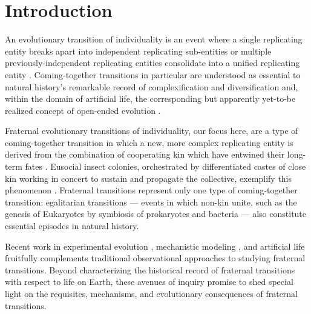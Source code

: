 \section{Introduction}

An evolutionary transition of individuality is an event where a single replicating entity breaks apart into independent replicating sub-entities or multiple previously-independent replicating entities consolidate into a unified replicating entity \citep{smith1997major}.
Coming-together transitions in particular are understood as essential to natural history's remarkable record of complexification and diversification \citep{smith1997major} and, within the domain of artificial life, the corresponding but apparently yet-to-be realized concept of open-ended evolution \citep{taylor2016open, banzhaf2016defining}.

Fraternal evolutionary transitions of individuality, our focus here, are a type of coming-together transition in which a new, more complex replicating entity is derived from the combination of cooperating kin which have entwined their long-term fates \citep{west2015major}.
Eusocial insect colonies, orchestrated by differentiated castes of close kin working in concert to sustain and propagate the collective, exemplify this phenomenon \citep{smith1997major}.
Fraternal transitions represent only one type of coming-together transition: egalitarian transitions --- events in which non-kin unite, such as the genesis of Eukaryotes by symbiosis of prokaryotes and bacteria --- also constitute essential episodes in natural history.

Recent work in experimental evolution \citep{ratcliff2014experimental, ratcliff2015origins, gulli2019evolution, koschwanez2013improved}, mechanistic modeling \citep{hanschen2015evolutionary, staps2019emergence}, and artificial life \citep{goldsby2012task, goldsby2014evolutionary} fruitfully complements traditional observational approaches to studying fraternal transitions.
Beyond characterizing the historical record of fraternal transitions with respect to life on Earth, these avenues of inquiry promise to shed special light on the requisites, mechanisms, and evolutionary consequences of fraternal transitions.

